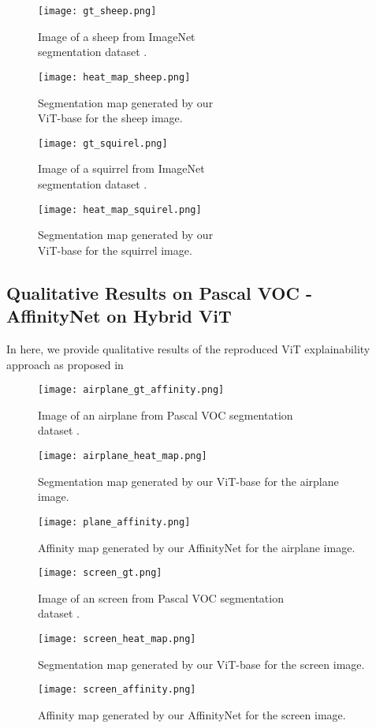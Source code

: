 \begin{figure}[H]
  \texttt{[image: gt\_sheep.png]}
  \caption{Image of a sheep from ImageNet \\segmentation dataset \cite{imagenet-seg}.}\label{fig:gt_sheep}
\endminipage\hfill
{}
  \texttt{[image: heat\_map\_sheep.png]}
  \caption{Segmentation map generated by our \\ViT-base for the sheep image.}\label{fig:map_sheep}
\endminipage\hfill
\end{figure}

\begin{figure}[H]
  \texttt{[image: gt\_squirel.png]}
  \caption{Image of a squirrel from ImageNet \\segmentation dataset \cite{imagenet-seg}.}\label{fig:gt_squirel}
\endminipage\hfill
{}
  \texttt{[image: heat\_map\_squirel.png]}
  \caption{Segmentation map generated by our \\ViT-base for the squirrel image.}\label{fig:map_squirel}
\endminipage\hfill
\end{figure}

\subsection{Qualitative Results on Pascal VOC - AffinityNet on Hybrid ViT}
\label{Pascal_results}
In here, we provide qualitative results of the reproduced ViT explainability approach as proposed in \cite{mainpaper}


\begin{figure}[H]
  \texttt{[image: airplane\_gt\_affinity.png]}
  \caption{Image of an airplane from Pascal VOC segmentation \\dataset \cite{ahn2018learning}.}
  \label{fig:plane_gt}
\endminipage\hfill
{}
  \texttt{[image: airplane\_heat\_map.png]}
  \caption{Segmentation map generated by our ViT-base for the airplane image.}
  \label{fig:phane_map}
\endminipage\hfill
{}%
  \texttt{[image: plane\_affinity.png]}
  \caption{Affinity map generated by our AffinityNet for the airplane image.}
  \label{fig:plane_aff}
\endminipage
\end{figure}

\begin{figure}[H]
  \texttt{[image: screen\_gt.png]}
  \caption{Image of an screen from Pascal VOC segmentation \\dataset \cite{ahn2018learning}.}
  \label{fig:screen_gt}
\endminipage\hfill
{}
  \texttt{[image: screen\_heat\_map.png]}
  \caption{Segmentation map generated by our ViT-base for the screen image.}
  \label{fig:screen_map}
\endminipage\hfill
{}%
  \texttt{[image: screen\_affinity.png]}
  \caption{Affinity map generated by our AffinityNet for the screen image.}
  \label{fig:screen_aff}
\endminipage
\end{figure}

